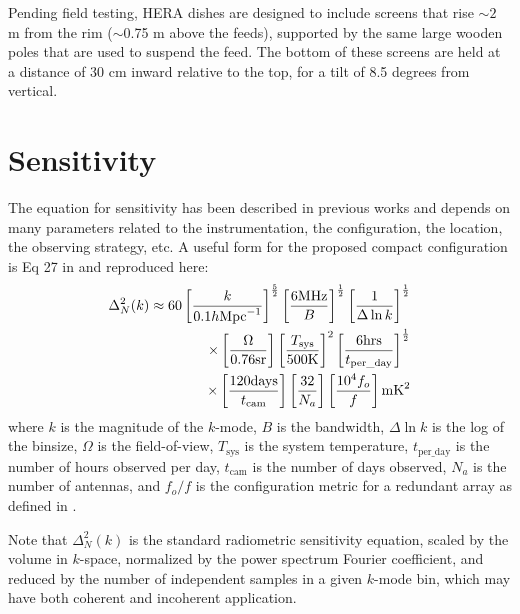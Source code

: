 \documentclass[11pt]{article}
\begin{document}
Pending field testing, HERA dishes are designed to include screens that rise $\sim2$ m from the rim ($\sim$0.75 m above the 
feeds), supported
by the same large wooden poles that are used to suspend the feed.  The bottom of these screens are held at a distance of
30 cm inward relative to the top, for a tilt of 8.5 degrees from vertical.

\section{Sensitivity}
The equation for sensitivity has been described in previous works \cite{unknown} and depends on many parameters
related to the instrumentation, the configuration, the location, the observing strategy, etc.  A useful form for 
the proposed compact configuration is Eq 27 in \citep{2012ApJ...753...81P} and reproduced here:
\begin{equation}
\centering
\label{eq:sensitivity}
\begin{split}
\Delta^2_N(k) \approx 60 \left[\frac{k}{0.1h\text{Mpc}^{-1}}\right]^\frac{5}{2}
                                         \left[\frac{6 \text{MHz}}{B}\right]^\frac{1}{2}
                                         \left[\frac{1}{\Delta\ln k}\right]^\frac{1}{2} \\
                        \times       \left[\frac{\Omega}{0.76\text{sr}}\right]
                                         \left[\frac{T_\text{sys}}{500 \text{K}}\right]^2
                                         \left[\frac{6 \text{hrs}}{t_\text{per\_day}}\right]^\frac{1}{2} \\
                        \times       \left[\frac{120\text{days}}{t_{\text{cam}}}\right]
                                         \left[\frac{32}{N_a}\right]
                                         \left[\frac{\text{10}^4f_o}{f}\right]  \text{mK}^2
\end{split}
\end{equation}
where $k$ is the magnitude of the $k$-mode, $B$ is the bandwidth, $\Delta\ln k$ is the log
of the binsize, $\Omega$ is the field-of-view, $T_{\text{sys}}$ is the system temperature, 
${t_\text{per\_day}}$ is the number of hours observed per day, $t_{\text{cam}}$ is the number of days
observed, $N_a$ is the number of antennas, and $f_o/f$ is the configuration metric for a 
redundant array as defined in \citep{2012ApJ...753...81P}.

Note that $\Delta^2_N(k)$ is the standard radiometric sensitivity equation, scaled by
the volume in $k$-space, normalized by the power spectrum Fourier coefficient, and
reduced by the number of independent samples in a given $k$-mode bin, which may have
both coherent and incoherent application.
\end{document}

